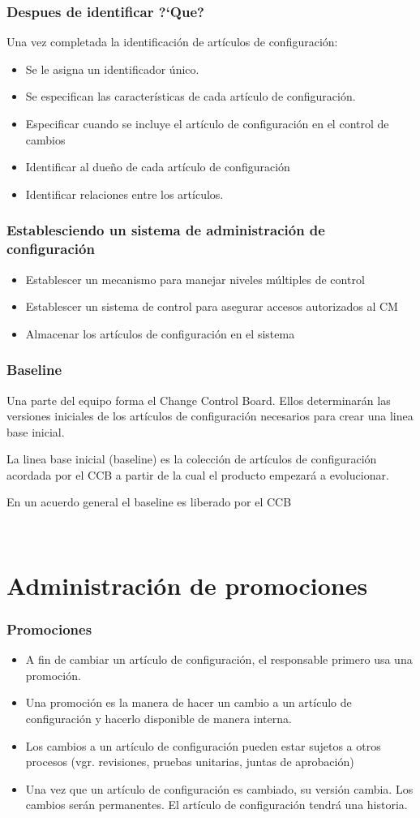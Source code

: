 \begin{frame}
	\frametitle{Despues de identificar ?`Que?}
Una vez completada la identificaci\'on de art\'iculos de configuraci\'on:
	\begin{itemize}
		\item Se le asigna un identificador \'unico. 
		\item Se especifican las caracter\'isticas de cada art\'iculo de configuraci\'on. 
		\item Especificar cuando se incluye el art\'iculo de configuraci\'on en el control de cambios
		\item Identificar al due\~no de cada art\'iculo de configuraci\'on
		\item Identificar relaciones entre los art\'iculos. 
	\end{itemize}
\end{frame}
\begin{frame}
	\frametitle{Establesciendo un sistema de administraci\'on de configuraci\'on}
	\begin{itemize}
		\item Establescer un mecanismo para manejar niveles m\'ultiples de control
		\item Establescer un sistema de control para asegurar accesos autorizados al CM
		\item Almacenar los art\'iculos de configuraci\'on en el sistema
	\end{itemize}
\end{frame}
\begin{frame}
	\frametitle{Baseline}
 	Una parte del equipo forma el Change Control Board. Ellos determinar\'an las versiones iniciales de 
	los art\'iculos de configuraci\'on necesarios para crear una linea base inicial. 

	La linea base inicial (baseline) es la colecci\'on de art\'iculos de configuraci\'on acordada por el CCB
	a partir de la cual el producto empezar\'a a evolucionar. 

	En un acuerdo general el baseline es liberado por el CCB
\end{frame}
\
\section{Administraci\'on de promociones}
\begin{frame}
	\frametitle{Promociones}
	\begin{itemize}
		\item A fin de cambiar un art\'iculo de configuraci\'on, el responsable primero usa una promoci\'on. 
		\item Una promoci\'on es la manera de hacer un cambio a un art\'iculo de configuraci\'on y hacerlo disponible de manera interna.
		\item Los cambios a un art\'iculo de configuraci\'on pueden estar sujetos a otros procesos (vgr. revisiones, pruebas unitarias, juntas de aprobaci\'on)
		\item Una vez que un art\'iculo de configuraci\'on es cambiado, su versi\'on cambia. Los cambios ser\'an permanentes. El art\'iculo de configuraci\'on tendr\'a una historia.  
	\end{itemize}
\end{frame}

